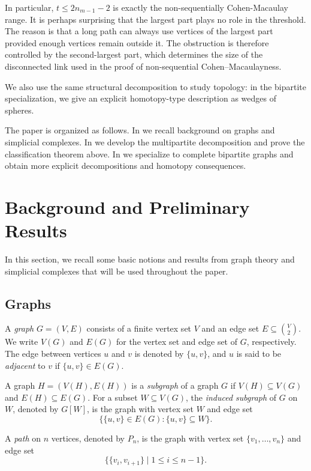 \documentclass[12pt,reqno]{amsart}
\theoremstyle{definition}
\begin{document}
In particular, $t\le 2n_{m-1}-2$ is exactly the non-sequentially Cohen-Macaulay range. 
It is perhaps surprising that the largest part plays no role in the threshold. 
The reason is that a long path can always use vertices of the largest part provided enough vertices remain outside it. 
The obstruction is therefore controlled by the second-largest part, which determines the size of the disconnected link used in the proof of non-sequential Cohen–Macaulayness.

We also use the same structural decomposition to study topology: in the bipartite specialization, we give an explicit homotopy-type description as wedges of spheres. 

The paper is organized as follows.
In  we recall background on graphs and simplicial complexes.
In  we develop the multipartite decomposition and prove the
classification theorem above.
In  we specialize to complete bipartite
graphs and obtain more explicit decompositions and homotopy consequences.

\section{Background and Preliminary Results}\label{sec: prep}

In this section, we recall some basic notions and results from graph theory and simplicial complexes that will be used throughout the paper.

\subsection{Graphs}

A \emph{graph} $G=(V,E)$ consists of a finite vertex set $V$ and an edge set $E \subseteq \binom{V}{2}$.
We write $V(G)$ and $E(G)$ for the vertex set and edge set of $G$, respectively. The edge between vertices $u$ and $v$ is denoted by $\{u,v\}$, and $u$ is said to be \emph{adjacent} to $v$ if $\{u,v\} \in E(G)$.  

A graph $H=(V(H),E(H))$ is a \emph{subgraph} of a graph $G$ if $V(H)\subseteq V(G)$ and $E(H)\subseteq E(G)$.  
For a subset $W\subseteq V(G)$, the \emph{induced subgraph} of $G$ on $W$, denoted by $G[W]$, is the graph with vertex set $W$ and edge set
\[
\{\{u,v\}\in E(G) : \{u,v\}\subseteq W\}.
\]


\medskip

A \emph{path} on $n$ vertices, denoted by $P_n$, is the graph with vertex set $\{v_1,\dots,v_n\}$ and edge set
\[
\{\{v_i,v_{i+1}\} \mid 1 \le i \le n-1\}.
\]
\end{document}
